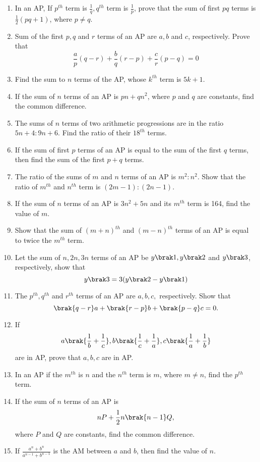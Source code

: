 \begin{enumerate}[label=\thesubsection.\arabic*, ref=\thesubsection.\theenumi]
\item In an AP,  If $p^{th}$ term is $\frac{1}{q}, q^{th}$ term is $\frac{1}{p}$,  prove that the sum of first $pq$ terms is $\frac{1}{2}(pq+1)$,  where $p \neq q.$
\item Sum of the first $p,  q$ and $r$ terms of an AP are $a,  b$ and $c$,  respectively. Prove that
$$\frac{a}{p}(q-r)+\frac{b}{q}(r-p)+\frac{c}{r}(p-q) = 0$$
\item Find the sum to $n$ terms of the AP,  whose $k^{th}$ term is $5k + 1$.
\item If the sum of $n$ terms of an AP is $pn + qn^2$,  where $p$ and $q$ are constants,  find the common difference.
\item The sums of $n$ terms of two arithmetic progressions are in the ratio $5n + 4 : 9n + 6$. Find the ratio of their $18^{th}$ terms.
\item If the sum of first $p$ terms of an AP is equal to the sum of the first $q$ terms,  then find the sum of the first $p + q$ terms.
\item The ratio of the sums of $m$ and $n$ terms of an AP is $m^2 : n^2$. Show that the ratio of 
$m^{th}$ and $n^{th}$ term is $(2m - 1) : (2n - 1)$.
\item If the sum of $n$ terms of an AP is $3n^2 + 5n$ and its $m^{th}$ term is 164,  find the value
of $m$.
\item Show that the sum of $(m + n)^{th}$ and $(m - n)^{th}$ terms of an AP is equal to twice the $m^{th}$ term.
\item Let the sum of $n,  2n,  3n$ terms of an AP be $y\brak 1,  y\brak 2$ and $y\brak 3$,  respectively,  show that 
$$y\brak 3 = 3(y\brak 2 - y\brak 1)$$
\item The $p^{th}, q^{th}$ and $r^{th}$ terms of an AP  are $a, b, c,$ respectively. Show that 
$$\brak {q - r }a + \brak {r - p }b + \brak {p - q }c = 0.$$
\item If $$a\brak {\frac{1}{b}+\frac{1}{c}}, b\brak {\frac{1}{c}+\frac{1}{a}}, c\brak {\frac{1}{a}+\frac{1}{b}}$$ are in AP, prove that $a, b, c$ are in AP. 
\item In an AP if the $m^{th}$ is $n$ and the $n^{th}$ term is $m$, where $m \ne n$, find the $p^{th}$ term.
\item If the sum of $n$ terms of an AP is
	$$nP+\frac{1}{2} n\brak {n-1}Q,$$
	where $P$ and $Q$ are constants, find the common difference.
\item If $\frac{a^n+b^n}{a^{n-1}+b^{n-1}}$ is the AM  between $a$ and $b$,  then find the value of $n$.

\end{enumerate}
